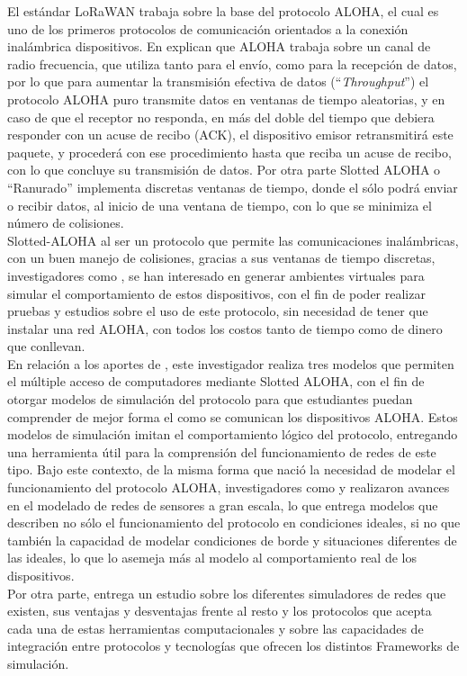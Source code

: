 \begin{justify}
El estándar LoRaWAN trabaja sobre la base del protocolo ALOHA, el cual es uno de los primeros protocolos de comunicación orientados a la conexión inalámbrica dispositivos. En \cite{NORMAN} explican que ALOHA trabaja sobre un canal de radio frecuencia, que utiliza tanto para el envío, como para la recepción de datos, por lo que para aumentar la transmisión efectiva de datos (``\textit{Throughput}'') el protocolo ALOHA puro transmite datos en ventanas de tiempo aleatorias, y en caso de que el receptor no responda, en más del doble del tiempo que debiera responder con un acuse de recibo (ACK), el dispositivo emisor retransmitirá este paquete, y procederá con ese procedimiento hasta que reciba un acuse de recibo, con lo que concluye su transmisión de datos. Por otra parte Slotted ALOHA  o ``Ranurado'' implementa discretas ventanas de tiempo, donde el sólo podrá enviar o recibir datos, al inicio de una ventana de tiempo, con lo que se minimiza el número de colisiones.\\
Slotted-ALOHA al ser un protocolo que permite las comunicaciones inalámbricas, con un buen manejo de colisiones, gracias a sus ventanas de tiempo discretas, investigadores como \cite{Abdullah}, se han interesado en generar ambientes virtuales para simular el comportamiento de estos dispositivos, con el fin de poder realizar pruebas y estudios sobre el uso de este protocolo, sin necesidad de tener que instalar una red ALOHA, con todos los costos tanto de tiempo como de dinero que conllevan.\\
En relación a los aportes de \cite{Abdullah}, este investigador realiza tres modelos que permiten el múltiple acceso de computadores mediante Slotted ALOHA, con el fin de otorgar modelos de simulación del protocolo para que estudiantes puedan comprender de mejor forma el como se comunican los dispositivos ALOHA. Estos modelos de simulación imitan el comportamiento lógico del protocolo, entregando una herramienta útil para la comprensión del funcionamiento de redes de este tipo. Bajo este contexto, de la misma forma que nació la necesidad de modelar el funcionamiento del protocolo ALOHA, investigadores como \cite{simulato} y \cite{simubook} realizaron avances en el modelado de redes de sensores a gran escala, lo que entrega modelos que describen no sólo el funcionamiento del protocolo en condiciones ideales, si no que también la capacidad de modelar condiciones de borde y situaciones diferentes de las ideales, lo que lo asemeja más al modelo al comportamiento real de los dispositivos.\\
Por otra parte, \cite{Murat} entrega un estudio sobre los diferentes simuladores de redes que existen, sus ventajas y desventajas frente al resto y los protocolos que acepta cada una de estas herramientas computacionales y sobre las capacidades de integración entre protocolos y tecnologías que ofrecen los distintos Frameworks de simulación.\\

\end{justify}
